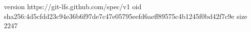 version https://git-lfs.github.com/spec/v1
oid sha256:4d5cfdd23c94e36b6f97de7c47e05795eefd6aeff89575c4b1245f0bd42f7c9e
size 2247
